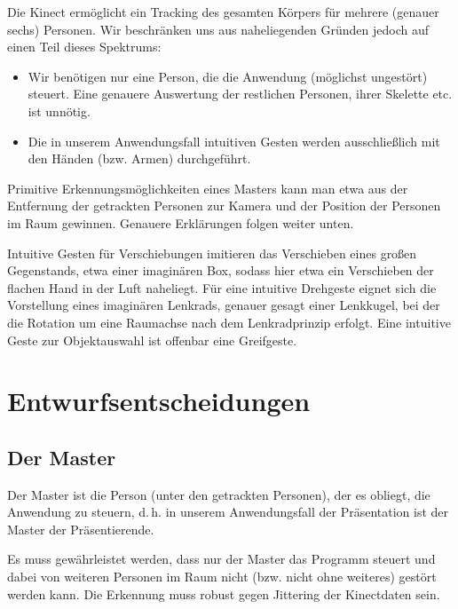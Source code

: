 \documentclass[11pt,a4paper]{scrartcl}
\begin{document}
	Die Kinect ermöglicht ein Tracking des gesamten Körpers für mehrere (genauer sechs) Personen. Wir beschränken uns aus naheliegenden Gründen jedoch auf einen Teil dieses Spektrums:
	\begin{itemize}
		\item Wir benötigen nur eine Person, die die Anwendung (möglichst ungestört) steuert. Eine genauere Auswertung der restlichen Personen, ihrer Skelette etc. ist unnötig.
		\item Die in unserem Anwendungsfall intuitiven Gesten werden ausschließlich mit den Händen (bzw. Armen) durchgeführt.
	\end{itemize}
	Primitive Erkennungsmöglichkeiten eines Masters kann man etwa aus der Entfernung der getrackten Personen zur Kamera und der Position der Personen im Raum gewinnen. Genauere Erklärungen folgen weiter unten.\par 
	Intuitive Gesten für Verschiebungen imitieren das Verschieben eines großen Gegenstands, etwa einer imaginären Box, sodass hier etwa ein Verschieben der flachen Hand in der Luft naheliegt. Für eine intuitive Drehgeste eignet sich die Vorstellung eines imaginären Lenkrads, genauer gesagt einer Lenkkugel, bei der die Rotation um eine Raumachse nach dem Lenkradprinzip erfolgt. Eine intuitive Geste zur Objektauswahl ist offenbar eine Greifgeste.
	\section{Entwurfsentscheidungen}
	\subsection{Der Master}
	Der Master ist die Person (unter den getrackten Personen), der es obliegt, die Anwendung zu steuern, d.\,h. in unserem Anwendungsfall der Präsentation ist der Master der Präsentierende.\par
	Es muss gewährleistet werden, dass nur der Master das Programm steuert und dabei von weiteren Personen im Raum nicht (bzw. nicht ohne weiteres) gestört werden kann. Die Erkennung muss robust gegen Jittering der Kinectdaten sein.
\end{document}
